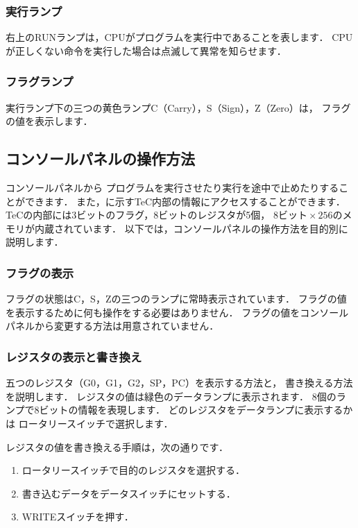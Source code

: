 \subsubsection{実行ランプ}
右上のRUNランプは，CPUがプログラムを実行中であることを表します．
CPUが正しくない命令を実行した場合は点滅して異常を知らせます．

\subsubsection{フラグランプ}
実行ランプ下の三つの黄色ランプC（Carry），S（Sign），Z（Zero）は，
フラグの値を表示します．

\subsection{コンソールパネルの操作方法}
\label{operation}
コンソールパネルから
プログラムを実行させたり実行を途中で止めたりすることができます．
また，に示すTeC内部の情報にアクセスすることができます．
TeCの内部には3ビットのフラグ，8ビットのレジスタが5個，
$8ビット \times 256$のメモリが内蔵されています．
以下では，コンソールパネルの操作方法を目的別に説明します．


\subsubsection{フラグの表示}
フラグの状態はC，S，Zの三つのランプに常時表示されています．
フラグの値を表示するために何も操作をする必要はありません．
フラグの値をコンソールパネルから変更する方法は用意されていません．

\subsubsection{レジスタの表示と書き換え}
五つのレジスタ（G0，G1，G2，SP，PC）を表示する方法と，
書き換える方法を説明します．
レジスタの値は緑色のデータランプに表示されます．
8個のランプで8ビットの情報を表現します．
どのレジスタをデータランプに表示するかは
ロータリースイッチで選択します．
\vspace{0.3cm}

レジスタの値を書き換える手順は，次の通りです．
\begin{enumerate}
\item ロータリースイッチで目的のレジスタを選択する．
\item 書き込むデータをデータスイッチにセットする．
\item WRITEスイッチを押す．
\end{enumerate}

